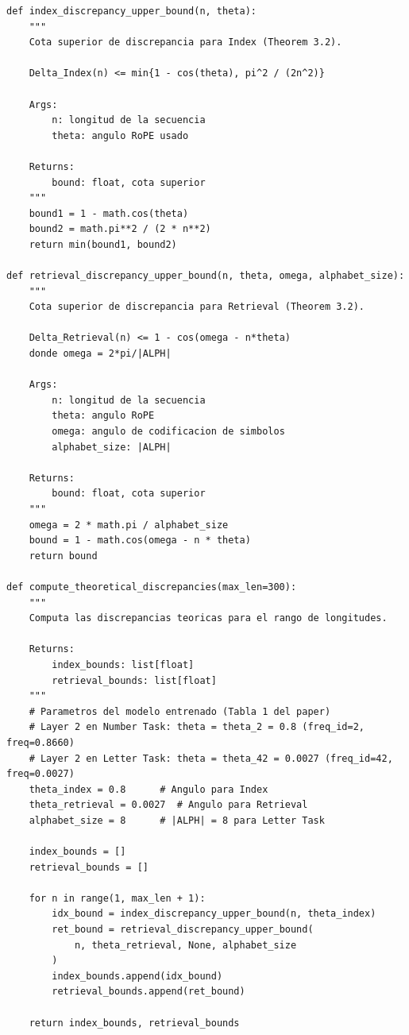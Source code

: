 \documentclass[12pt,a4paper]{report}
\begin{document}
\begin{lstlisting}
def index_discrepancy_upper_bound(n, theta):
    """
    Cota superior de discrepancia para Index (Theorem 3.2).
    
    Delta_Index(n) <= min{1 - cos(theta), pi^2 / (2n^2)}
    
    Args:
        n: longitud de la secuencia
        theta: angulo RoPE usado
    
    Returns:
        bound: float, cota superior
    """
    bound1 = 1 - math.cos(theta)
    bound2 = math.pi**2 / (2 * n**2)
    return min(bound1, bound2)

def retrieval_discrepancy_upper_bound(n, theta, omega, alphabet_size):
    """
    Cota superior de discrepancia para Retrieval (Theorem 3.2).
    
    Delta_Retrieval(n) <= 1 - cos(omega - n*theta)
    donde omega = 2*pi/|ALPH|
    
    Args:
        n: longitud de la secuencia
        theta: angulo RoPE
        omega: angulo de codificacion de simbolos
        alphabet_size: |ALPH|
    
    Returns:
        bound: float, cota superior
    """
    omega = 2 * math.pi / alphabet_size
    bound = 1 - math.cos(omega - n * theta)
    return bound

def compute_theoretical_discrepancies(max_len=300):
    """
    Computa las discrepancias teoricas para el rango de longitudes.
    
    Returns:
        index_bounds: list[float]
        retrieval_bounds: list[float]
    """
    # Parametros del modelo entrenado (Tabla 1 del paper)
    # Layer 2 en Number Task: theta = theta_2 = 0.8 (freq_id=2, freq=0.8660)
    # Layer 2 en Letter Task: theta = theta_42 = 0.0027 (freq_id=42, freq=0.0027)
    theta_index = 0.8      # Angulo para Index
    theta_retrieval = 0.0027  # Angulo para Retrieval
    alphabet_size = 8      # |ALPH| = 8 para Letter Task
    
    index_bounds = []
    retrieval_bounds = []
    
    for n in range(1, max_len + 1):
        idx_bound = index_discrepancy_upper_bound(n, theta_index)
        ret_bound = retrieval_discrepancy_upper_bound(
            n, theta_retrieval, None, alphabet_size
        )
        index_bounds.append(idx_bound)
        retrieval_bounds.append(ret_bound)
    
    return index_bounds, retrieval_bounds
\end{lstlisting}
\end{document}
